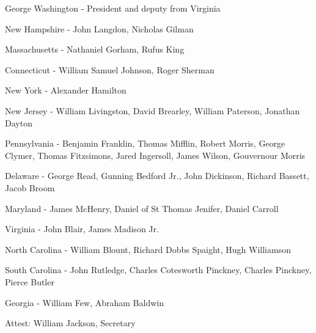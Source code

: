 \documentclass{article}
\begin{document}
George Washington - President and deputy from Virginia

New Hampshire - John Langdon, Nicholas Gilman

Massachusetts - Nathaniel Gorham, Rufus King

Connecticut - William Samuel Johnson, Roger Sherman

New York - Alexander Hamilton

New Jersey - William Livingston, David Brearley, William Paterson, Jonathan
Dayton

Pennsylvania - Benjamin Franklin, Thomas Mifflin, Robert Morris, George Clymer,
Thomas Fitzsimons, Jared Ingersoll, James Wilson, Gouvernour Morris

Delaware - George Read, Gunning Bedford Jr., John Dickinson, Richard Bassett,
Jacob Broom

Maryland - James McHenry, Daniel of St Thomas Jenifer, Daniel Carroll

Virginia - John Blair, James Madison Jr.

North Carolina - William Blount, Richard Dobbs Spaight, Hugh Williamson

South Carolina - John Rutledge, Charles Cotesworth Pinckney, Charles Pinckney,
Pierce Butler

Georgia - William Few, Abraham Baldwin

Attest: William Jackson, Secretary
\end{document}
